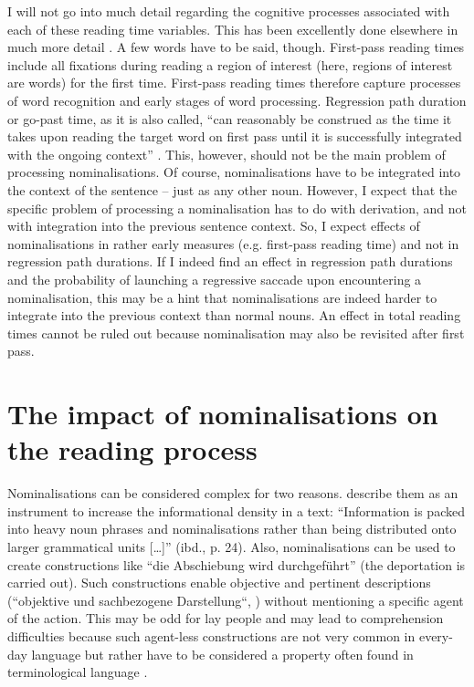 \documentclass[output=paper]{langsci/langscibook}
\begin{document}
I will not go into much detail regarding the cognitive processes associated with each of these reading time variables. This has been excellently done elsewhere in much more detail \citep{Clifton2007, Hyona2003, Rayner2006}. A few words have to be said, though. First-pass reading times include all fixations during reading a region of interest (here, regions of interest are words) for the first time. First-pass reading times therefore capture processes of word recognition and early stages of word processing. Regression path duration or go-past time, as it is also called, ``can reasonably be construed as the time it takes upon reading the target word on first pass until it is successfully integrated with the ongoing context'' \citep[620]{Rayner2006}. This, however, should not be the main problem of processing nominalisations. Of course, nominalisations have to be integrated into the context of the sentence -- just as any other noun. However, I expect that the specific problem of processing a nominalisation has to do with derivation, and not with integration into the previous sentence context. So, I expect effects of nominalisations in rather early measures (e.g. first-pass reading time) and not in regression path durations. If I indeed find an effect in regression path durations and the probability of launching a regressive saccade upon encountering a nominalisation, this may be a hint that nominalisations are indeed harder to integrate into the previous context than normal nouns. An effect in total reading times cannot be ruled out because nominalisation may also be revisited after first pass.

\section{\label{bkm:Ref283726002}The impact of nominalisations on the reading process}

Nominalisations can be considered complex for two reasons. \citet{Hansen2006} describe them as an instrument to increase the informational density in a text: ``Information is packed into heavy noun phrases and nominalisations rather than being distributed onto larger grammatical units [\ldots]'' (ibd., p. 24). Also, nominalisations can be used to create constructions like ``die Abschiebung wird durchgeführt'' (the deportation is carried out). Such constructions enable objective and pertinent descriptions (``objektive und sachbezogene Darstellung``, \citealt[169]{HansenSchirra2004}) without mentioning a specific agent of the action. This may be odd for lay people and may lead to comprehension difficulties because such agent-less constructions are not very common in every-day language but rather have to be considered a property often found in terminological language \citep[cf. ][170]{HansenSchirra2004}. 
\end{document}
